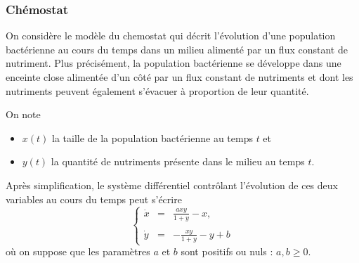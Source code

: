 \subsubsection{Chémostat}


On considère le modèle du chemostat qui décrit l'évolution d'une population bactérienne au cours du temps dans un milieu alimenté par un flux constant de nutriment. 
Plus précisément, la population bactérienne se développe dans une enceinte close alimentée d'un côté par un flux constant de nutriments et dont les nutriments peuvent également s'évacuer à proportion de leur quantité.

On note
\begin{itemize}
  \item $x(t)$ la taille de la population bactérienne au temps $t$ et
  \item $y(t)$ la quantité de nutriments présente dans le milieu au temps $t$.
\end{itemize}
Après simplification, le système différentiel contrôlant l'évolution de ces deux variables au cours du temps peut s'écrire
$$
\left\{\begin{array}{rcl} 
        \dot x & = & \displaystyle{\frac{a x y}{1 + y} - x}, \\
        \\
        \dot y & = & \displaystyle{- \frac{x y}{1 + y} - y + b}
       \end{array}
\right.
$$
où on suppose que les paramètres $a$ et $b$ sont positifs ou nuls : $a, b \geq 0$.

